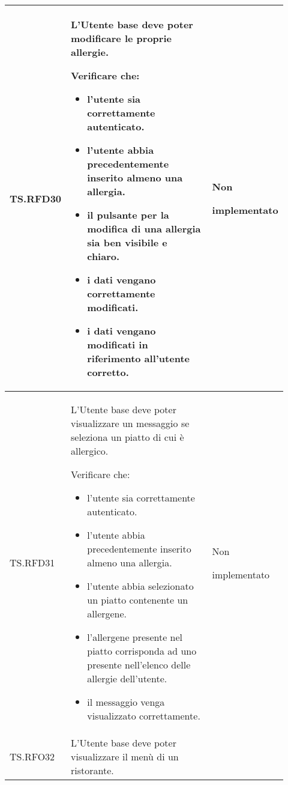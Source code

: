 \begin{longtable}{|p{0.10\linewidth}|p{0.70\linewidth}|p{0.12\linewidth}|}
	\hline
	TS.RFD30                                                                                                                        &
	L'Utente base deve poter modificare le proprie allergie. \par
	Verificare che:
	\begin{itemize}
		\item l'utente sia correttamente autenticato.
		\item l'utente abbia precedentemente inserito almeno una allergia.
		\item il pulsante per la modifica di una allergia sia ben visibile e chiaro.
		\item i dati vengano correttamente modificati.
		\item i dati vengano modificati in riferimento all'utente corretto.
	\end{itemize}                                                    &
	Non \par implementato                                                                                                                                                   \\
	\hline
	TS.RFD31                                                                                                                        &
	L'Utente base deve poter visualizzare un messaggio se seleziona un piatto di cui è allergico. \par
	Verificare che:
	\begin{itemize}
		\item l'utente sia correttamente autenticato.
		\item l'utente abbia precedentemente inserito almeno una allergia.
		\item l'utente abbia selezionato un piatto contenente un allergene.
		\item l'allergene presente nel piatto corrisponda ad uno presente nell'elenco delle allergie dell'utente.
		\item il messaggio venga visualizzato correttamente.
	\end{itemize}                       &
	Non \par implementato                                                                                                                                                   \\
	\hline
	TS.RFO32                                                                                                                        &
	L'Utente base deve poter visualizzare il menù di un ristorante. \par

\end{longtable}
